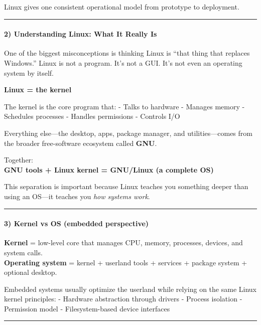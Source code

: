 \documentclass[
  english,
  paper=a4,
  oneside  ,captions=tableheading
]{scrartcl}
\begin{document}
Linux gives one consistent operational model from prototype to
deployment.

\begin{center}\rule{0.5\linewidth}{0.5pt}\end{center}

\paragraph{2) Understanding Linux: What It Really
Is}\label{understanding-linux-what-it-really-is}

One of the biggest misconceptions is thinking Linux is ``that thing that
replaces Windows.'' Linux is not a program. It's not a GUI. It's not
even an operating system by itself.

\textbf{Linux = the kernel}

The kernel is the core program that: - Talks to hardware - Manages
memory - Schedules processes - Handles permissions - Controls I/O

Everything else---the desktop, apps, package manager, and
utilities---comes from the broader free-software ecosystem called
\textbf{GNU}.

Together:\\
\textbf{GNU tools + Linux kernel = GNU/Linux (a complete OS)}

This separation is important because Linux teaches you something deeper
than using an OS---it teaches you \emph{how systems work}.

\begin{center}\rule{0.5\linewidth}{0.5pt}\end{center}

\paragraph{3) Kernel vs OS (embedded
perspective)}\label{kernel-vs-os-embedded-perspective}

\textbf{Kernel} = low-level core that manages CPU, memory, processes,
devices, and system calls.\\
\textbf{Operating system} = kernel + userland tools + services + package
system + optional desktop.

Embedded systems usually optimize the userland while relying on the same
Linux kernel principles: - Hardware abstraction through drivers -
Process isolation - Permission model - Filesystem-based device
interfaces

\begin{center}\rule{0.5\linewidth}{0.5pt}\end{center}
\end{document}
